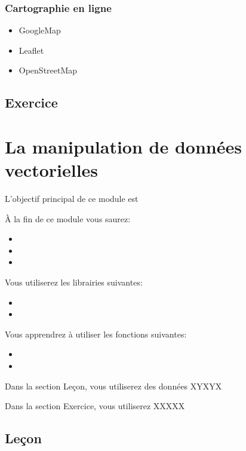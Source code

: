 \documentclass[
  12pt,
]{krantz}
\providecommand{\tightlist}{%
  \setlength{\itemsep}{0pt}\setlength{\parskip}{0pt}}
\begin{document}
\hypertarget{cartographie-en-ligne}{%
\subsection{Cartographie en ligne}\label{cartographie-en-ligne}}

\begin{itemize}
\tightlist
\item
  GoogleMap
\item
  Leaflet
\item
  OpenStreetMap
\end{itemize}

\hypertarget{exercice-4}{%
\section{Exercice}\label{exercice-4}}

\hypertarget{map_vec}{%
\chapter{La manipulation de données vectorielles}\label{map_vec}}

L'objectif principal de ce module est

À la fin de ce module vous saurez:

\begin{itemize}
\item
\item
\item
\end{itemize}

Vous utiliserez les librairies suivantes:

\begin{itemize}
\item
\item
\end{itemize}

Vous apprendrez à utiliser les fonctions suivantes:

\begin{itemize}
\item
\item
\end{itemize}

Dans la section Leçon, vous utiliserez des données XYXYX

Dans la section Exercice, vous utiliserez XXXXX

\hypertarget{leuxe7on-5}{%
\section{Leçon}\label{leuxe7on-5}}
\end{document}
